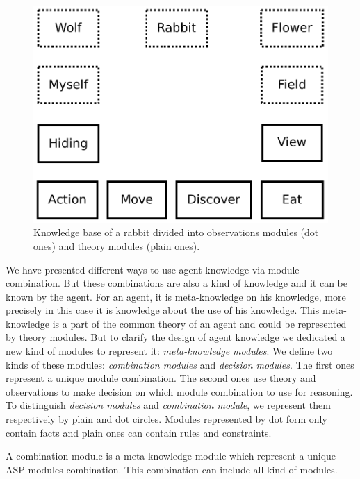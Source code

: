 \documentclass{aamas2012}
\begin{document}
	\begin{figure}
		\centering
		\includegraphics[keepaspectratio=true, scale=0.4]{module_combination.pdf}
		\caption
		{
			\label{module_combination}
			Knowledge base of a rabbit divided into observations modules (dot ones) and theory modules (plain ones).
		}
	\end{figure}

	We have presented different ways to use agent knowledge via module combination.
	But these combinations are also a kind of knowledge and it can be known by the agent.
	For an agent, it is meta-knowledge on his knowledge, more precisely in this case it is knowledge about the use of his knowledge.
	This meta-knowledge is a part of the common theory of an agent and could be represented by theory modules.
	But to clarify the design of agent knowledge we dedicated a new kind of modules to represent it: \emph{meta-knowledge modules}.
	We define two kinds of these modules: \emph{combination modules} and \emph{decision modules}.
	The first ones represent a unique module combination.
	The second ones use theory and observations to make decision on which module combination to use for reasoning.
	To distinguish \emph{decision modules} and \emph{combination module}, we represent them respectively by plain and dot circles.
	Modules represented by dot form only contain facts and plain ones can contain rules and constraints.
	
	\begin{definition}
		A combination module is a meta-knowledge module which represent a unique ASP modules combination.
		This combination can include all kind of modules.
	\end{definition}
	
\end{document}
